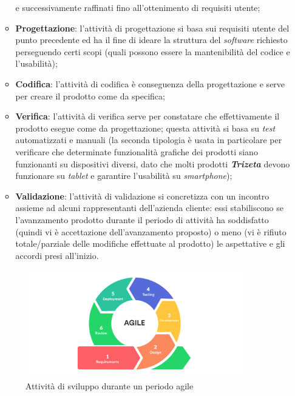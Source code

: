 \begin{itemize}
\begin{itemize}
                e successivamente raffinati fino all'ottenimento di requisiti utente;
            \item \textbf{Progettazione}: l'attività di progettazione si basa sui requisiti utente del punto precedente ed ha il fine di ideare la struttura del \textit{software} richiesto perseguendo certi scopi 
                (quali possono essere la mantenibilità del codice e l'usabilità);
            \item \textbf{Codifica}: l'attività di codifica è conseguenza della progettazione e serve per creare il prodotto come da specifica;
            \item \textbf{Verifica}: l'attività di verifica serve per constatare che effettivamente il prodotto esegue come da progettazione; questa attività si basa su \textit{test} automatizzati e manuali (la seconda tipologia
                è usata in particolare per verificare che determinate funzionalità grafiche dei prodotti siano funzionanti su dispositivi diversi, dato che molti prodotti \textit{\textbf{Trizeta}} devono
                funzionare su \textit{tablet} e garantire l'usabilità su \textit{smartphone});
            \item \textbf{Validazione}: l'attività di validazione si concretizza con un incontro assieme ad alcuni rappresentanti dell'azienda cliente: essi stabiliscono se l'avanzamento prodotto durante il periodo di attività ha soddisfatto
                (quindi vi è accettazione dell'avanzamento proposto) o meno (vi è rifiuto totale/parziale delle modifiche effettuate al prodotto) le aspettative e gli accordi presi all'inizio.
        \end{itemize}
        \begin{figure}[H]
            \centering
            \includegraphics[width=0.9\textwidth]{images/agile.png}
            \caption[Attività di sviluppo durante un periodo agile]{Attività di sviluppo durante un periodo agile\footnotemark}
        \end{figure}

\end{itemize}
